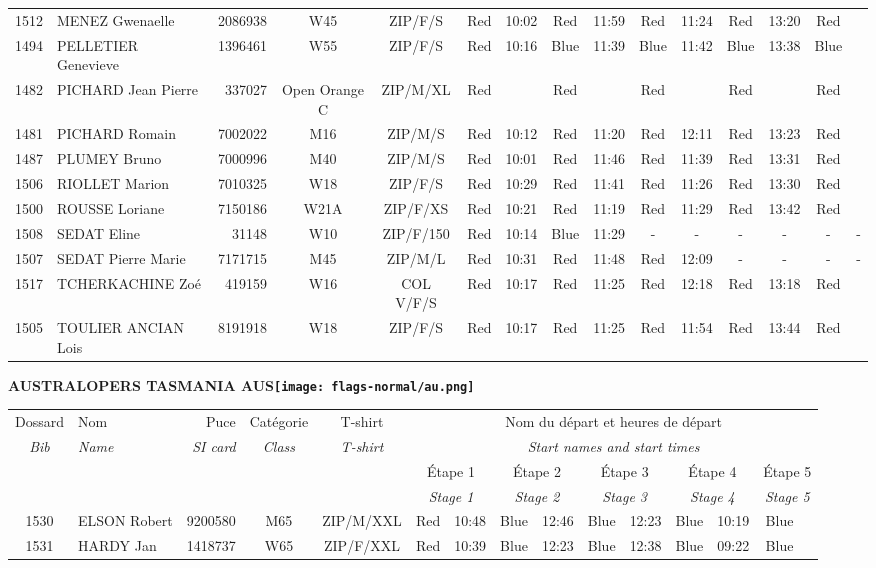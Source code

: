 \documentclass{report}
\begin{document}
\begin{longtable}{|c|l|r|c|c|*{5}{cc|}}
    1512 & MENEZ Gwenaelle & 2086938 & W45 & ZIP/F/S & Red & 10:02 & Red & 11:59 & Red & 11:24 & Red & 13:20 & Red &  \\
    1494 & PELLETIER Genevieve & 1396461 & W55 & ZIP/F/S & Red & 10:16 & Blue & 11:39 & Blue & 11:42 & Blue & 13:38 & Blue &  \\
    1482 & PICHARD Jean Pierre & 337027 & Open Orange C & ZIP/M/XL & Red &   & Red &   & Red &   & Red &   & Red &  \\
    1481 & PICHARD Romain & 7002022 & M16 & ZIP/M/S & Red & 10:12 & Red & 11:20 & Red & 12:11 & Red & 13:23 & Red &  \\
    1487 & PLUMEY Bruno & 7000996 & M40 & ZIP/M/S & Red & 10:01 & Red & 11:46 & Red & 11:39 & Red & 13:31 & Red &  \\
    1506 & RIOLLET Marion & 7010325 & W18 & ZIP/F/S & Red & 10:29 & Red & 11:41 & Red & 11:26 & Red & 13:30 & Red &  \\
    1500 & ROUSSE Loriane & 7150186 & W21A & ZIP/F/XS & Red & 10:21 & Red & 11:19 & Red & 11:29 & Red & 13:42 & Red &  \\
    1508 & SEDAT Eline & 31148 & W10 & ZIP/F/150 & Red & 10:14 & Blue & 11:29 & - &  - & - &  - & - &  -\\
    1507 & SEDAT Pierre Marie & 7171715 & M45 & ZIP/M/L & Red & 10:31 & Red & 11:48 & Red & 12:09 & - &  - & - &  -\\
    1517 & TCHERKACHINE Zoé & 419159 & W16 & COL V/F/S & Red & 10:17 & Red & 11:25 & Red & 12:18 & Red & 13:18 & Red &  \\
    1505 & TOULIER ANCIAN Lois & 8191918 & W18 & ZIP/F/S & Red & 10:17 & Red & 11:25 & Red & 11:54 & Red & 13:44 & Red &  \\
  \end{longtable}
\newpage
  \Huge \centering \bfseries AUSTRALOPERS TASMANIA  AUS\normalfont \footnotesize \sffamily \hfill \texttt{[image: flags-normal/au.png]} \newline 
  \begin{longtable}{|c|l|r|c|c|*{5}{cc|}}
    Dossard & Nom  & Puce    & Catégorie & T-shirt & \multicolumn{10}{c|}{Nom du départ et heures de départ} \\
    \itshape Bib     & \itshape Name & \itshape SI card & \itshape Class  & \itshape  T-shirt  & \multicolumn{10}{c|}{\itshape Start names and start times} \\
    \hline
    & & & & & \multicolumn{2}{c|}{Étape 1} & \multicolumn{2}{c|}{Étape 2} & \multicolumn{2}{c|}{Étape 3} & \multicolumn{2}{c|}{Étape 4} & \multicolumn{2}{c|}{Étape 5} \\
    & & & & & \multicolumn{2}{c|}{\itshape Stage 1} & \multicolumn{2}{c|}{\itshape Stage 2} & \multicolumn{2}{c|}{\itshape Stage 3} & \multicolumn{2}{c|}{\itshape Stage 4} & \multicolumn{2}{c|}{\itshape Stage 5} \\
    \hline
    1530 & ELSON Robert & 9200580 & M65 & ZIP/M/XXL & Red & 10:48 & Blue & 12:46 & Blue & 12:23 & Blue & 10:19 & Blue &  \\
    1531 & HARDY Jan & 1418737 & W65 & ZIP/F/XXL & Red & 10:39 & Blue & 12:23 & Blue & 12:38 & Blue & 09:22 & Blue &  \\
  \end{longtable}
\end{document}
